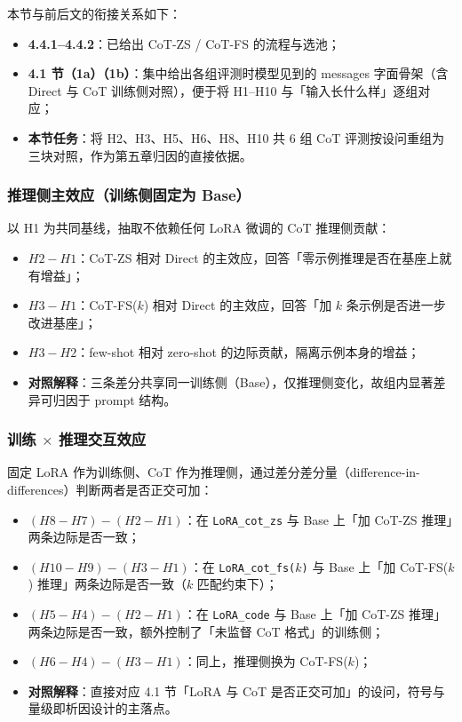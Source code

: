 
本节与前后文的衔接关系如下：
\begin{itemize}
    \item \textbf{4.4.1--4.4.2}：已给出 CoT-ZS / CoT-FS 的流程与选池；
    \item \textbf{4.1 节（1a）（1b）}：集中给出各组评测时模型见到的 messages 字面骨架（含 Direct 与 CoT 训练侧对照），便于将 H1--H10 与「输入长什么样」逐组对应；
    \item \textbf{本节任务}：将 H2、H3、H5、H6、H8、H10 共 6 组 CoT 评测按设问重组为三块对照，作为第五章归因的直接依据。
\end{itemize}

\subsubsection{推理侧主效应（训练侧固定为 Base）}
以 H1 为共同基线，抽取不依赖任何 LoRA 微调的 CoT 推理侧贡献：
\begin{itemize}
    \item \textbf{$H2 - H1$}：CoT-ZS 相对 Direct 的主效应，回答「零示例推理是否在基座上就有增益」；
    \item \textbf{$H3 - H1$}：CoT-FS($k$) 相对 Direct 的主效应，回答「加 $k$ 条示例是否进一步改进基座」；
    \item \textbf{$H3 - H2$}：few-shot 相对 zero-shot 的边际贡献，隔离示例本身的增益；
    \item \textbf{对照解释}：三条差分共享同一训练侧（Base），仅推理侧变化，故组内显著差异可归因于 prompt 结构。
\end{itemize}

\subsubsection{训练 $\times$ 推理交互效应}
固定 LoRA 作为训练侧、CoT 作为推理侧，通过差分差分量（difference-in-differences）判断两者是否正交可加：
\begin{itemize}
    \item \textbf{$(H8 - H7) - (H2 - H1)$}：在 \texttt{LoRA\_cot\_zs} 与 Base 上「加 CoT-ZS 推理」两条边际是否一致；
    \item \textbf{$(H10 - H9) - (H3 - H1)$}：在 \texttt{LoRA\_cot\_fs($k$)} 与 Base 上「加 CoT-FS($k$) 推理」两条边际是否一致（$k$ 匹配约束下）；
    \item \textbf{$(H5 - H4) - (H2 - H1)$}：在 \texttt{LoRA\_code} 与 Base 上「加 CoT-ZS 推理」两条边际是否一致，额外控制了「未监督 CoT 格式」的训练侧；
    \item \textbf{$(H6 - H4) - (H3 - H1)$}：同上，推理侧换为 CoT-FS($k$)；
    \item \textbf{对照解释}：直接对应 4.1 节「LoRA 与 CoT 是否正交可加」的设问，符号与量级即析因设计的主落点。
\end{itemize}

